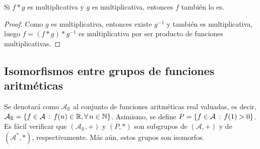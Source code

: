 \begin{corollary}
Si $f*g$ es multiplicativa y $g$ es multiplicativa, entonces $f$ también lo es.
\end{corollary}
\begin{proof}
Como $g$ es multiplicativa, entonces existe $g^{-1}$ y también es multiplicativa, luego $f=(f*g)*g^{-1}$ es multiplicativa por ser producto de funciones multiplicativas.
\end{proof}

\subsection{Isomorfismos entre grupos de funciones aritméticas}

Se denotará como $\mathcal{A}_\mathbb{R}$ al conjunto de funciones aritméticas real valuadas, es decir, $\mathcal{A}_{\mathbb{R}}=\{ f \in \mathcal{A} \std f(n) \in \mathbb{R}, \forall n \in \mathbb{N} \}$. Asimismo, se define $P=\{ f \in \mathcal{A} \, : \, f(1)>0 \}$. Es fácil verificar que $(\mathcal{A}_{\mathbb{R}},+)$ y $(P,*)$ son subgrupos de $(\mathcal{A},+)$ y de $(\mathcal{A}^*,*)$, respectivamente. Más aún, estos grupos son isomorfos.

